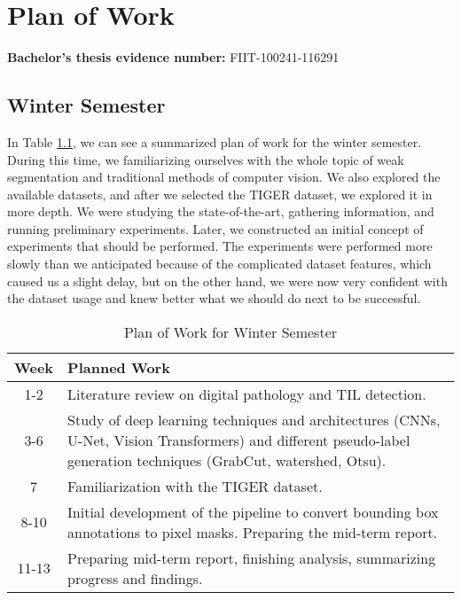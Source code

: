 \chapter{Plan of Work \label{appendix:plan} }
\renewcommand{\thepage}{A-\arabic{page}}
\setcounter{page}{1}

\textbf{Bachelor's thesis evidence number:} FIIT-100241-116291

\section{Winter Semester}
In Table \ref{tab:winter_plan}, we can see a summarized plan of work for the winter semester. During this time, we familiarizing ourselves with the whole topic of weak segmentation and traditional methods of computer vision. We also explored the available datasets, and after we selected the TIGER dataset, we explored it in more depth. We were studying the state-of-the-art, gathering information, and running preliminary experiments. Later, we constructed an initial concept of experiments that should be performed. The experiments were performed more slowly than we anticipated because of the complicated dataset features, which caused us a slight delay, but on the other hand, we were now very confident with the dataset usage and knew better what we should do next to be successful.

\begin{table}[h!]
\centering
\begin{tabular}{|c|p{12.5cm}|}
\hline
\textbf{Week} & \textbf{Planned Work} \\ 
\hline
\hline
1-2 & Literature review on digital pathology and TIL detection. \\ 
\hline
3-6 & Study of deep learning techniques and architectures (CNNs, U-Net, Vision Transformers) and different pseudo-label generation techniques (GrabCut, watershed, Otsu). \\
\hline
7 & Familiarization with the TIGER dataset. \\
\hline
8-10 & Initial development of the pipeline to convert bounding box annotations to pixel masks. Preparing the mid-term report. \\ 
\hline
11-13 & Preparing mid-term report, finishing analysis, summarizing progress and findings. \\ 
\hline
\end{tabular}
\caption{Plan of Work for Winter Semester}
\label{tab:winter_plan}
\end{table}

